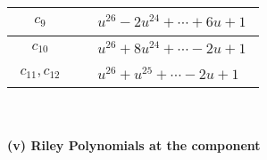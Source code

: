 \documentclass[1p]{elsarticle_modified}
\theoremstyle{definition}
\begin{document}
\begin{tabular}{m{50pt}|m{274pt}}
\hline $$\begin{aligned}c_{9}\end{aligned}$$&$\begin{aligned}
&u^{26}-2 u^{24}+\cdots+6 u+1
\end{aligned}$\\
\hline $$\begin{aligned}c_{10}\end{aligned}$$&$\begin{aligned}
&u^{26}+8 u^{24}+\cdots-2 u+1
\end{aligned}$\\
\hline $$\begin{aligned}c_{11},c_{12}\end{aligned}$$&$\begin{aligned}
&u^{26}+u^{25}+\cdots-2 u+1
\end{aligned}$\\
\hline
\end{tabular}\\~\\
\newpage\renewcommand{\arraystretch}{1}
\flushleft \textbf{(v) Riley Polynomials at the component}\newline \\
\end{document}
